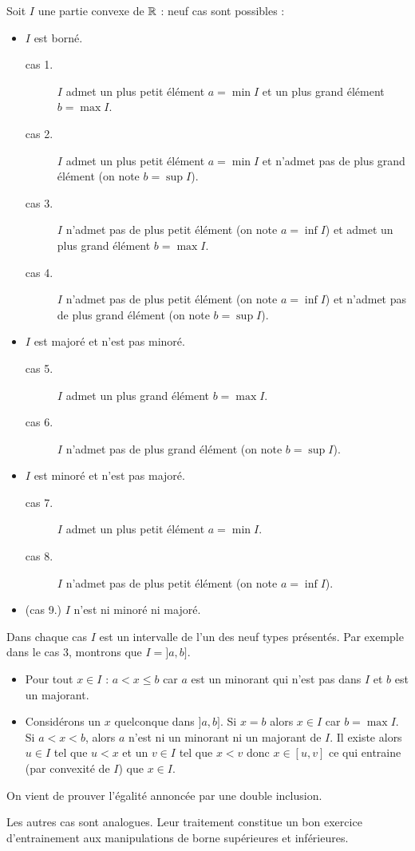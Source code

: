 \begin{demo}
 Soit $I$ une partie convexe de $\mathbb{R}$ : neuf cas sont possibles :
\begin{itemize}
 \item $I$ est borné. \begin{description}
 \item[cas 1.]  $I$ admet un plus petit élément $a=\min I$ et un plus grand élément $b=\max I$.
 \item[cas 2.]  $I$ admet un plus petit élément $a=\min I$ et n'admet pas de plus grand élément (on note $b=\sup I$).
 \item[cas 3.]  $I$ n'admet pas de plus petit élément (on note $a=\inf I$) et admet un plus grand élément $b=\max I$.
 \item[cas 4.]  $I$ n'admet pas de plus petit élément (on note $a=\inf I$) et n'admet pas de plus grand élément (on note $b=\sup I$).
\end{description}
 \item $I$ est majoré et n'est pas minoré. \begin{description}
   \item[cas 5.] $I$ admet un plus grand élément $b=\max I$.
   \item[cas 6.] $I$ n'admet pas de plus grand élément (on note $b=\sup I$).
\end{description}

 \item $I$ est minoré et n'est pas majoré.\begin{description}
   \item[cas 7.] $I$ admet un plus petit élément $a=\min I$. 
   \item[cas 8.] $I$ n'admet pas de plus petit élément (on note $a=\inf I$).
\end{description}

 \item (cas 9.) $I$ n'est ni minoré ni majoré.

\end{itemize}
Dans chaque cas $I$ est un intervalle de l'un des neuf types présentés.\newline
Par exemple dans le cas 3, montrons que $I= ]a,b]$.\begin{itemize}
 \item Pour tout $x\in I$ : $a < x \leq b$ car $a$ est un minorant qui n'est pas dans $I$ et $b$ est un majorant.
 \item Considérons un $x$ quelconque dans $]a,b]$. Si $x=b$ alors $x\in I$ car $b=\max I$. Si $a<x<b$, alors $a$ n'est ni un minorant ni un majorant de $I$. Il existe alors $u\in I$ tel que $u<x$ et un $v\in I$ tel que $x<v$ donc $x\in [u,v]$ ce qui entraine (par convexité de $I$) que $x\in I$.
\end{itemize}
On vient de prouver l'égalité annoncée par une double inclusion.

Les autres cas sont analogues. Leur traitement constitue un bon exercice d'entrainement aux manipulations de borne supérieures et inférieures. 
\end{demo}

